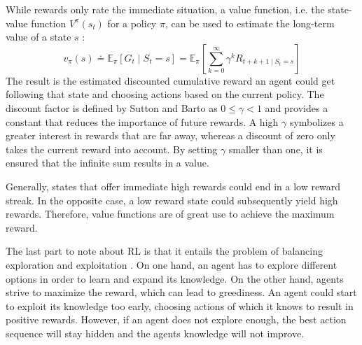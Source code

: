 While rewards only rate the immediate situation, a value function, i.e. the state-value function $V^\pi(s_t)$ for a policy $\pi$, can be used to estimate the long-term value of a state $s$ \cite{suba18}:
\begin{equation}\label{eq:value_func}
    v_\pi(s) \doteq \mathbb{E}_\pi \left[ G_t \mid S_t = s \right] = \mathbb{E}_\pi \left[ \sum^{\infty}_{k=0} \gamma^k R_{t+k+1 \mid S_t = s}  \right]
\end{equation}
The result is the estimated discounted cumulative reward an agent could get following that state and choosing actions based on the current policy. The discount factor is defined by Sutton and Barto as $0 \le \gamma < 1$ and provides a constant that reduces the importance of future rewards. A high $\gamma$ symbolizes a greater interest in rewards that are far away, whereas a discount of zero only takes the current reward into account. By setting $\gamma$ smaller than one, it is ensured that the infinite sum results in a value.

Generally, states that offer immediate high rewards could end in a 
low reward streak. In the opposite case, a low reward state could subsequently yield high rewards. Therefore, value functions are of great use to achieve the maximum reward.

The last part to note about RL is that it entails the problem of balancing exploration and exploitation \cite{suba18}. On one hand, an agent has to explore different options in order to learn and expand its knowledge. On the other hand, agents strive to maximize the reward, which can lead to greediness. An agent could start to exploit its knowledge too early, choosing actions of which it knows to result in positive rewards. However, if an agent does not explore enough, the best action sequence will stay hidden and the agents knowledge will not improve.

